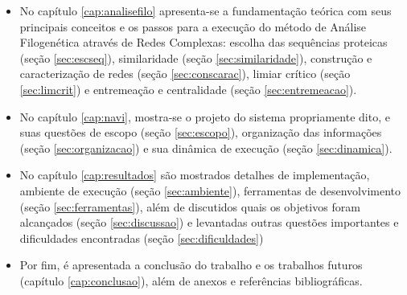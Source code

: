 \begin{itemize}
  \item{No capítulo \ref{cap:analisefilo} apresenta-se a fundamentação teórica com seus principais conceitos
e os passos para a execução do método de Análise Filogenética através de Redes Complexas: escolha das sequências proteicas (seção \ref{sec:escseq}),
similaridade (seção \ref{sec:similaridade}), construção e caracterização de redes (seção \ref{sec:conscarac}), limiar crítico (seção \ref{sec:limcrit})
e entremeação e centralidade (seção \ref{sec:entremeacao}).}
  \item{No capítulo \ref{cap:navi}, mostra-se o projeto do sistema propriamente dito, e suas questões
de escopo (seção \ref{sec:escopo}), organização das informações (seção \ref{sec:organizacao}) e sua dinâmica de execução (seção \ref{sec:dinamica}).}
  \item{No capítulo \ref{cap:resultados} são mostrados detalhes de implementação, ambiente de execução (seção \ref{sec:ambiente}), ferramentas de
desenvolvimento (seção \ref{sec:ferramentas}), além de discutidos quais os objetivos foram alcançados (seção \ref{sec:discussao}) e levantadas
outras questões importantes e dificuldades encontradas (seção \ref{sec:dificuldades})}
  \item{Por fim, é apresentada a conclusão do trabalho e os trabalhos futuros (capítulo \ref{cap:conclusao}), além de anexos e referências bibliográficas.}
\end{itemize}





